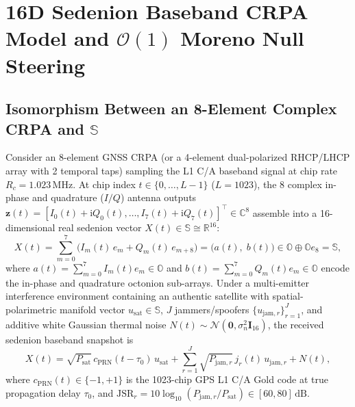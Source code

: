 \documentclass[11pt,a4paper]{article}
\theoremstyle{definition}
\theoremstyle{remark}
\newcommand{\R}{\mathbb{R}}
\newcommand{\C}{\mathbb{C}}
\newcommand{\Oc}{\mathbb{O}}
\newcommand{\Se}{\mathbb{S}}
\begin{document}
\section{16D Sedenion Baseband CRPA Model and $\mathcal{O}(1)$ Moreno Null Steering}
\label{sec:crpa_model}

\subsection{Isomorphism Between an 8-Element Complex CRPA and $\Se$}
Consider an 8-element GNSS CRPA (or a 4-element dual-polarized RHCP/LHCP array with 2 temporal taps) sampling the L1 C/A baseband signal at chip rate $R_c = 1.023\,\mathrm{MHz}$. At chip index $t \in \{0, \dots, L-1\}$ ($L = 1023$), the 8 complex in-phase and quadrature ($I/Q$) antenna outputs $\bm{z}(t) = [I_0(t) + \mathrm{i}Q_0(t), \dots, I_7(t) + \mathrm{i}Q_7(t)]^\top \in \C^8$ assemble into a 16-dimensional real sedenion vector $X(t) \in \Se \cong \R^{16}$:
\begin{equation}
\label{eq:sedenion_snap}
X(t) = \sum_{m=0}^{7} \Big( I_m(t) \, e_m + Q_m(t) \, e_{m+8} \Big) = \big(a(t), \; b(t)\big) \in \Oc \oplus \Oc e_8 = \Se,
\end{equation}
where $a(t) = \sum_{m=0}^7 I_m(t) e_m \in \Oc$ and $b(t) = \sum_{m=0}^7 Q_m(t) e_m \in \Oc$ encode the in-phase and quadrature octonion sub-arrays. Under a multi-emitter interference environment containing an authentic satellite with spatial-polarimetric manifold vector $u_{\mathrm{sat}} \in \Se$, $J$ jammers/spoofers $\{u_{\mathrm{jam}, r}\}_{r=1}^J$, and additive white Gaussian thermal noise $N(t) \sim \mathcal{N}(\bm{0}, \sigma_n^2 \bm{I}_{16})$, the received sedenion baseband snapshot is
\begin{equation}
\label{eq:signal_model}
X(t) = \sqrt{P_{\mathrm{sat}}} \, c_{\mathrm{PRN}}(t - \tau_0) \, u_{\mathrm{sat}} + \sum_{r=1}^{J} \sqrt{P_{\mathrm{jam}, r}} \, j_r(t) \, u_{\mathrm{jam}, r} + N(t),
\end{equation}
where $c_{\mathrm{PRN}}(t) \in \{-1, +1\}$ is the 1023-chip GPS L1 C/A Gold code at true propagation delay $\tau_0$, and $\mathrm{JSR}_r = 10\log_{10}(P_{\mathrm{jam}, r} / P_{\mathrm{sat}}) \in [60, 80]\,\mathrm{dB}$.
\end{document}
